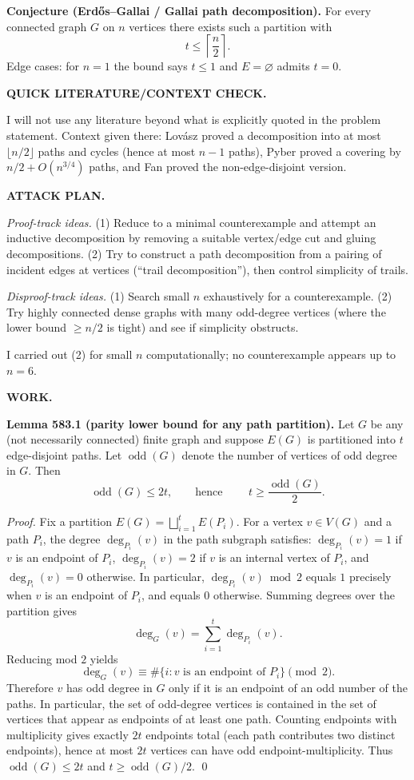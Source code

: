 \smallskip
\noindent\textbf{Conjecture (Erd\H{o}s--Gallai / Gallai path decomposition).}
For every connected graph $G$ on $n$ vertices there exists such a partition with
\[
 t\le \left\lceil \frac n2\right\rceil.
\]
Edge cases: for $n=1$ the bound says $t\le 1$ and $E=\varnothing$ admits $t=0$.

\bigskip
\noindent\textbf{QUICK LITERATURE/CONTEXT CHECK.}

I will not use any literature beyond what is explicitly quoted in the problem statement.
Context given there: Lov\'asz proved a decomposition into at most $\lfloor n/2\rfloor$ paths and cycles (hence at most $n-1$ paths), Pyber proved a covering by $n/2+O(n^{3/4})$ paths, and Fan proved the non-edge-disjoint version.

\bigskip
\noindent\textbf{ATTACK PLAN.}

\emph{Proof-track ideas.}
(1) Reduce to a minimal counterexample and attempt an inductive decomposition by removing a suitable vertex/edge cut and gluing decompositions.
(2) Try to construct a path decomposition from a pairing of incident edges at vertices (``trail decomposition''), then control simplicity of trails.

\emph{Disproof-track ideas.}
(1) Search small $n$ exhaustively for a counterexample.
(2) Try highly connected dense graphs with many odd-degree vertices (where the lower bound $\ge n/2$ is tight) and see if simplicity obstructs.

I carried out (2) for small $n$ computationally; no counterexample appears up to $n=6$.

\bigskip
\noindent\textbf{WORK.}

\noindent\textbf{Lemma 583.1 (parity lower bound for any path partition).}
Let $G$ be any (not necessarily connected) finite graph and suppose $E(G)$ is partitioned into $t$ edge-disjoint paths. Let $\operatorname{odd}(G)$ denote the number of vertices of odd degree in $G$. Then
\[
\operatorname{odd}(G)\le 2t,\qquad\text{hence }\qquad t\ge \frac{\operatorname{odd}(G)}2.
\]

\noindent\emph{Proof.}
Fix a partition $E(G)=\bigsqcup_{i=1}^t E(P_i)$.
For a vertex $v\in V(G)$ and a path $P_i$, the degree $\deg_{P_i}(v)$ in the path subgraph satisfies:
$\deg_{P_i}(v)=1$ if $v$ is an endpoint of $P_i$, $\deg_{P_i}(v)=2$ if $v$ is an internal vertex of $P_i$, and $\deg_{P_i}(v)=0$ otherwise.
In particular, $\deg_{P_i}(v)\bmod 2$ equals $1$ precisely when $v$ is an endpoint of $P_i$, and equals $0$ otherwise.
Summing degrees over the partition gives
\[
\deg_G(v)=\sum_{i=1}^t \deg_{P_i}(v).
\]
Reducing mod $2$ yields
\[
\deg_G(v)\equiv \#\{i: v \text{ is an endpoint of }P_i\}\pmod 2.
\]
Therefore $v$ has odd degree in $G$ only if it is an endpoint of an odd number of the paths.
In particular, the set of odd-degree vertices is contained in the set of vertices that appear as endpoints of at least one path.
Counting endpoints with multiplicity gives exactly $2t$ endpoints total (each path contributes two distinct endpoints), hence at most $2t$ vertices can have odd endpoint-multiplicity.
Thus $\operatorname{odd}(G)\le 2t$ and $t\ge \operatorname{odd}(G)/2$.
\qed

